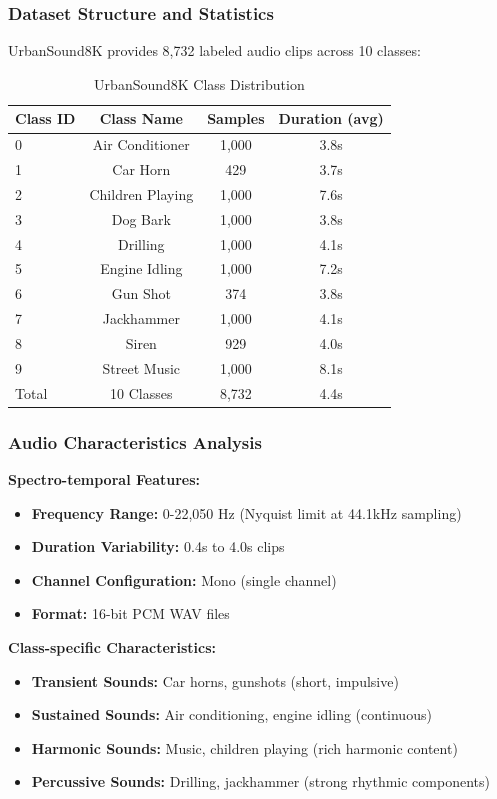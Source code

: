 \documentclass[conference]{IEEEtran}
\begin{document}
\subsubsection{Dataset Structure and Statistics}
\label{sec:q2_dataset_structure}

UrbanSound8K provides 8,732 labeled audio clips across 10 classes:

\begin{table}[H]
\centering
\caption{UrbanSound8K Class Distribution}
\begin{tabular}{l c c c}
\toprule
Class ID & Class Name & Samples & Duration (avg) \\
\midrule
0 & Air Conditioner & 1,000 & 3.8s \\
1 & Car Horn & 429 & 3.7s \\
2 & Children Playing & 1,000 & 7.6s \\
3 & Dog Bark & 1,000 & 3.8s \\
4 & Drilling & 1,000 & 4.1s \\
5 & Engine Idling & 1,000 & 7.2s \\
6 & Gun Shot & 374 & 3.8s \\
7 & Jackhammer & 1,000 & 4.1s \\
8 & Siren & 929 & 4.0s \\
9 & Street Music & 1,000 & 8.1s \\
\midrule
Total & 10 Classes & 8,732 & 4.4s \\
\toprule
\end{tabular}
\label{tab:urbansound_classes}
\end{table}

\subsubsection{Audio Characteristics Analysis}
\label{sec:q2_audio_analysis}

\textbf{Spectro-temporal Features:}
\begin{itemize}
  \item \textbf{Frequency Range:} 0-22,050 Hz (Nyquist limit at 44.1kHz sampling)
  \item \textbf{Duration Variability:} 0.4s to 4.0s clips
  \item \textbf{Channel Configuration:} Mono (single channel)
  \item \textbf{Format:} 16-bit PCM WAV files
\end{itemize}

\textbf{Class-specific Characteristics:}
\begin{itemize}
  \item \textbf{Transient Sounds:} Car horns, gunshots (short, impulsive)
  \item \textbf{Sustained Sounds:} Air conditioning, engine idling (continuous)
  \item \textbf{Harmonic Sounds:} Music, children playing (rich harmonic content)
  \item \textbf{Percussive Sounds:} Drilling, jackhammer (strong rhythmic components)
\end{itemize}
\end{document}
